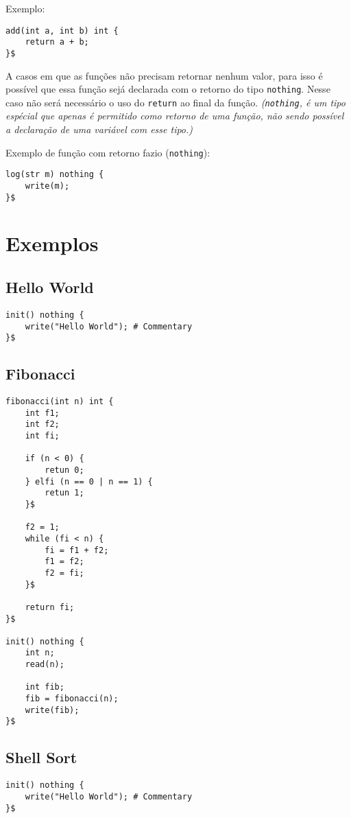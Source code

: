 \documentclass[a4paper,11pt]{article}
\begin{document}
Exemplo:
\begin{lstlisting}
add(int a, int b) int {
    return a + b;
}$
\end{lstlisting}

A casos em que as funções não precisam retornar nenhum valor, para isso é possível que essa função
sejá declarada com o retorno do tipo \texttt{nothing}. Nesse caso não será necessário o uso do
\texttt{return} ao final da função. \textit{(\texttt{nothing}, é um tipo espécial que apenas é
permitido como retorno de uma função, não sendo possível a declaração de uma variável com esse tipo.)}

Exemplo de função com retorno fazio (\texttt{nothing}):
\begin{lstlisting}
log(str m) nothing {
    write(m);
}$
\end{lstlisting}

\section{Exemplos}

\subsection{Hello World}
\begin{lstlisting}
init() nothing {
    write("Hello World"); # Commentary
}$
\end{lstlisting}

\pagebreak

\subsection{Fibonacci}
\begin{lstlisting}
fibonacci(int n) int {
    int f1;
    int f2;
    int fi;

    if (n < 0) {
        retun 0;
    } elfi (n == 0 | n == 1) {
        retun 1;
    }$

    f2 = 1;
    while (fi < n) {
        fi = f1 + f2;
        f1 = f2;
        f2 = fi;
    }$

    return fi;
}$

init() nothing {
    int n;
    read(n);
    
    int fib;
    fib = fibonacci(n);
    write(fib);
}$
\end{lstlisting}

\pagebreak

\subsection{Shell Sort}
\begin{lstlisting}
init() nothing {
    write("Hello World"); # Commentary
}$
\end{lstlisting}
\end{document}
